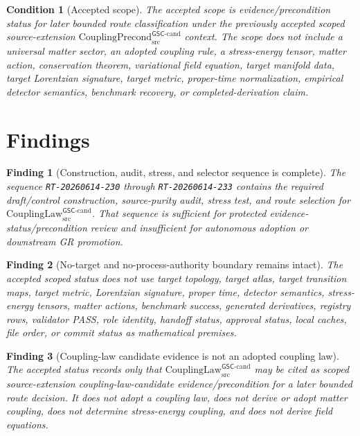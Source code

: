 \documentclass[11pt]{article}
\newcommand{\CouplingPrecond}{\mathrm{CouplingPrecond}^{\mathsf{GSC}\mbox{-}\mathrm{cand}}_{\mathrm{src}}}
\newcommand{\CouplingLaw}{\mathrm{CouplingLaw}^{\mathsf{GSC}\mbox{-}\mathrm{cand}}_{\mathrm{src}}}
\newtheorem{finding}{Finding}
\newtheorem{condition}{Condition}
\begin{document}
\begin{condition}[Accepted scope]
The accepted scope is evidence/precondition status for later bounded route
classification under the previously accepted scoped source-extension
\(\CouplingPrecond\) context. The scope does not include a universal matter
sector, an adopted coupling rule, a stress-energy tensor, matter action,
conservation theorem, variational field equation, target manifold data,
target Lorentzian signature, target metric, proper-time normalization,
empirical detector semantics, benchmark recovery, or completed-derivation
claim.
\end{condition}

\section{Findings}

\begin{finding}[Construction, audit, stress, and selector sequence is complete]
The sequence \texttt{RT-20260614-230} through \texttt{RT-20260614-233}
contains the required draft/control construction, source-purity audit, stress
test, and route selection for \(\CouplingLaw\). That sequence is sufficient
for protected evidence-status/precondition review and insufficient for
autonomous adoption or downstream GR promotion.
\end{finding}

\begin{finding}[No-target and no-process-authority boundary remains intact]
The accepted scoped status does not use target topology, target atlas, target
transition maps, target metric, Lorentzian signature, proper time, detector
semantics, stress-energy tensors, matter actions, benchmark success,
generated derivatives, registry rows, validator PASS, role identity, handoff
status, approval status, local caches, file order, or commit status as
mathematical premises.
\end{finding}

\begin{finding}[Coupling-law candidate evidence is not an adopted coupling law]
The accepted status records only that \(\CouplingLaw\) may be cited as scoped
source-extension coupling-law-candidate evidence/precondition for a later
bounded route decision. It does not adopt a coupling law, does not derive or
adopt matter coupling, does not determine stress-energy coupling, and does
not derive field equations.
\end{finding}
\end{document}
